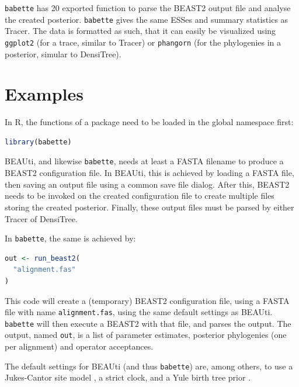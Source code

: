 \documentclass{article}
\begin{document}
\verb;babette; has 20 exported function to parse the BEAST2 output
file and analyse the created posterior. \verb;babette; gives the
same ESSes and summary statistics as Tracer. The data is formatted
as such, that it can easily be visualized using \verb;ggplot2; (for a trace,
similar to Tracer)
or \verb;phangorn; (for the phylogenies in a posterior, simular to DensiTree). 

\section{Examples}

In R, the functions of a package need to be loaded in the global namespace first:

\begin{lstlisting}[language=R, caption=Loading, label=lst:loading_babette, floatplacement=H]
library(babette)
\end{lstlisting}

BEAUti, and likewise \verb;babette;, needs at least a FASTA filename
to produce a BEAST2 configuration file. 
In BEAUti, this is achieved by loading a FASTA file, 
then saving an output file using a common
save file dialog. After this, BEAST2 needs to be invoked
on the created configuration file to create multiple files
storing the created posterior. Finally, these output
files must be parsed by either Tracer of DensiTree.

In \verb;babette;, the same is achieved by:

\begin{lstlisting}[language=R, caption=Simplest example, label=lst:simplest_example, floatplacement=H]
out <- run_beast2(
  "alignment.fas"
)
\end{lstlisting}

This code will create a (temporary) BEAST2 configuration file,
using a FASTA file with name \verb;alignment.fas;, 
using the same default settings as BEAUti.
\verb;babette; will then execute a BEAST2 with that file, and
parses the output. The output, named \verb;out;, is a list of
parameter estimates, posterior phylogenies (one per alignment)
and operator acceptances. 

The default settings for BEAUti (and thus \verb;babette;) are, 
among others, to use a Jukes-Cantor site model \cite{cantor1969mammalian}, 
a strict clock, and a Yule birth tree prior \cite{yule}. 
\end{document}
